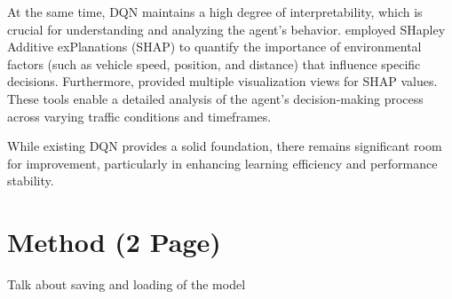 \documentclass{article}
\begin{document}
At the same time, DQN maintains a high degree of interpretability, which is crucial for understanding and analyzing the agent's behavior. \citep{bellotti_explaining_2023} employed SHapley Additive exPlanations (SHAP) to quantify the importance of environmental factors (such as vehicle speed, position, and distance) that influence specific decisions. Furthermore, \citep{bellotti_designing_2023} provided multiple visualization views for SHAP values. These tools enable a detailed analysis of the agent’s decision-making process across varying traffic conditions and timeframes.

While existing DQN provides a solid foundation, there remains significant room for improvement, particularly in enhancing learning efficiency and performance stability. 




\section{Method (2 Page)}


Talk about saving and loading of the model
\end{document}
